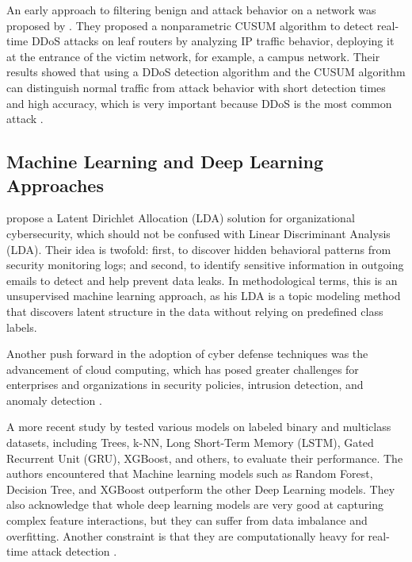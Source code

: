 \documentclass[final,5p,times,twocolumn]{elsarticle}
\begin{document}
An early approach to filtering benign and attack behavior on a network was proposed by \cite{zhang2010real}. They proposed a nonparametric CUSUM algorithm to detect real-time DDoS attacks on leaf routers by analyzing IP traffic behavior, deploying it at the entrance of the victim network, for example, a campus network. Their results showed that using a DDoS detection algorithm and the CUSUM algorithm can distinguish normal traffic from attack behavior with short detection times and high accuracy, which is very important because DDoS is the most common attack \citep{zhang2010real,alharthi2025comparative,altaf_gnn-based_2024}.

\subsection{Machine Learning and Deep Learning Approaches}

\citep{huang_jingwei_big_2017} propose a Latent Dirichlet Allocation (LDA) solution for organizational cybersecurity, which should not be confused with Linear Discriminant Analysis (LDA). Their idea is twofold: first, to discover hidden behavioral patterns from security monitoring logs; and second, to identify sensitive information in outgoing emails to detect and help prevent data leaks. In methodological terms, this is an unsupervised machine learning approach, as his LDA is a topic modeling method that discovers latent structure in the data without relying on predefined class labels.

Another push forward in the adoption of cyber defense techniques was the advancement of cloud computing, which has posed greater challenges for enterprises and organizations in security policies, intrusion detection, and anomaly detection \citep{huang_jingwei_big_2017}.

A more recent study by \cite{alharthi2025comparative} tested various models on labeled binary and multiclass datasets, including Trees, k-NN, Long Short-Term Memory (LSTM), Gated Recurrent Unit (GRU), XGBoost, and others, to evaluate their performance. The authors encountered that Machine learning models such as Random Forest, Decision Tree, and XGBoost outperform the other Deep Learning models. They also acknowledge that whole deep learning models are very good at capturing complex feature interactions, but they can suffer from data imbalance and overfitting. Another constraint is that they are computationally heavy for real-time attack detection \citep{alharthi2025comparative}.
\end{document}
